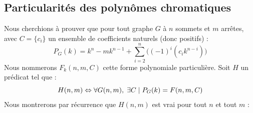 \subsection{Particularités des polynômes chromatiques}
Nous cherchions à prouver que pour tout graphe $G$ à $n$ sommets et $m$ arrêtes, avec $C = \{c_i\}$ un ensemble de coefficients naturels (donc positifs) : 
\[ P_G(k) = k^n - mk^{n-1} + \sum_{i = 2}^n \Big((-1)^i(c_ik^{n-i})\Big) \]
Nous nommerons $F_k(n,m,C)$ cette forme polynomiale particulière. Soit $H$ un prédicat tel que :
\[ H(n,m) \Leftrightarrow \forall{G(n,m)}, \hspace{1mm} \exists{C} \hspace{1mm} 
										| \hspace{1mm} P_G(k) = F(n, m, C) \]
Nous montrerons par récurrence que $H(n,m)$ est vrai pour tout $n$ et tout $m$ :
